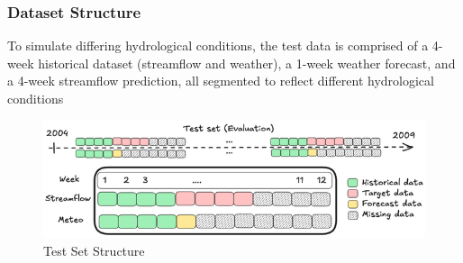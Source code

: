 \documentclass[ruler]{CUP-JNL-EDS}%
\begin{document}
\subsubsection*{Dataset Structure}
To simulate differing hydrological conditions, the test data is comprised of a 4-week historical dataset (streamflow and weather), a 1-week weather forecast, and 
a 4-week streamflow prediction, all segmented to reflect different hydrological conditions
\begin{figure}[htbp]
    \includegraphics[width=1.0\textwidth]{./assets/images/test-set-explained.png}
    \caption{Test Set Structure}
    \label{fig:test_set_distribution}
\end{figure} 
\end{document}
